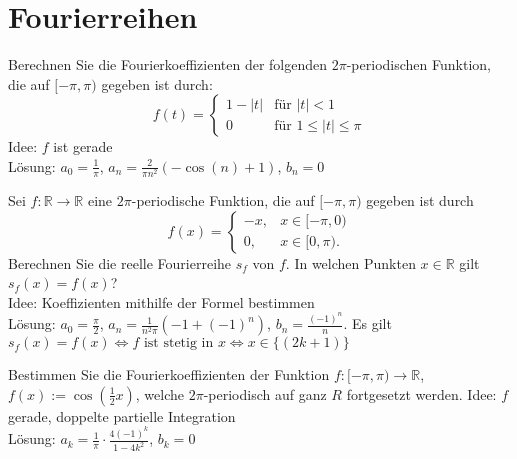 \section{Fourierreihen}
Berechnen Sie die Fourierkoeffizienten der folgenden $2\pi$-periodischen Funktion, die auf $[-\pi, \pi)$ gegeben ist durch:
\begin{displaymath}
  f(t) =
  \begin{cases}
    1 - |t|& \text{für } |t| < 1\\
    0& \text{für } 1 \leq |t| \leq \pi
  \end{cases}
\end{displaymath}
Idee: $f$ ist gerade\\
Lösung: $a_0 = \frac{1}{\pi}$, $a_n = \frac{2}{\pi n^2}(-\cos(n) + 1)$, $b_n = 0$

Sei $f : \mathbb{R} \to \mathbb{R}$ eine $2\pi$-periodische Funktion, die auf $[-\pi, \pi)$ gegeben ist durch
\begin{displaymath}
  f(x) =
  \begin{cases}
    -x,& x \in [-\pi,0)\\
    0,& x \in [0,\pi).
  \end{cases}
\end{displaymath}
Berechnen Sie die reelle Fourierreihe $s_f$ von $f$.
In welchen Punkten $x \in \mathbb{R}$ gilt $s_f(x) = f(x)$?\\
Idee: Koeffizienten mithilfe der Formel bestimmen\\
Lösung: $a_0 = \frac{\pi}{2}$, $a_n = \frac{1}{n^2 \pi}(-1 + (-1)^n)$, $b_n = \frac{(-1)^n}{n}$.
Es gilt $s_f(x) = f(x) \iff f \text{ ist stetig in } x \iff x \in \{(2k+1)\}$

Bestimmen Sie die Fourierkoeffizienten der Funktion $f : [-\pi, \pi) \to \mathbb{R}$, $f(x) := \cos\left(\frac{1}{2}x\right)$, welche $2\pi$-periodisch auf ganz $R$ fortgesetzt werden.
Idee: $f$ gerade, doppelte partielle Integration\\
Lösung: $a_k = \frac{1}{\pi} \cdot \frac{4(-1)^k}{1-4k^2}$, $b_k = 0$